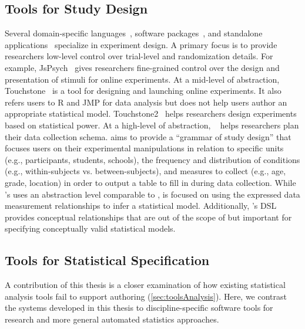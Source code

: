 \subsection{Tools for Study Design}
Several domain-specific languages~\cite{gosset,bakshy2014planout}, software
packages~\cite{edibble,blair2019declaring}, and standalone
applications~\cite{mackay2007touchstone,eiselmayer2019touchstone2} specialize in
experiment design. A primary focus is to provide researchers low-level control
over trial-level and randomization details. For example,
JsPsych~\cite{deLeeuw2015jspsych} gives researchers fine-grained control over
the design and presentation of stimuli for online experiments. At a mid-level of
abstraction, Touchstone~\cite{mackay2007touchstone} is a %
tool for designing and launching online experiments. It also refers users to R
and JMP for data analysis but does not help users author an appropriate
statistical model. Touchstone2~\cite{eiselmayer2019touchstone2} helps
researchers design experiments based on statistical power. At a high-level of
abstraction, \edibble~\cite{edibble} helps researchers plan their data collection
schema. \edibble aims to provide a ``grammar of study design'' that focuses users
on their experimental manipulations in relation to specific units (e.g.,
participants, students, schools), the frequency and distribution of conditions
(e.g., within-subjects vs. between-subjects), and measures to collect (e.g.,
age, grade, location) in order to output a table to fill in during data
collection. While \tisane's \SDSLlong uses an abstraction level comparable to
\edibble, \tisane is focused on using the expressed data measurement relationships
to infer a statistical model. Additionally, \tisane's DSL  provides conceptual
relationships that are out of the scope of \edibble but important for specifying
conceptually valid statistical models.


\subsection{Tools for Statistical Specification}
A contribution of this thesis is a closer examination of how existing
statistical analysis tools fail to support authoring
(\autoref{sec:toolsAnalysis}). Here, we contrast the systems developed in this
thesis to discipline-specific software tools for research and more general
automated statistics approaches. 

